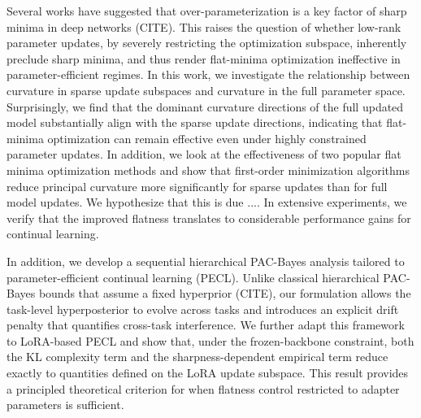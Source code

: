 \documentclass{article}
\theoremstyle{plain}
\theoremstyle{definition}
\theoremstyle{remark}
\newcommand{\JW}[1]{{\color{magenta}{\bf JW:} #1}}
\begin{document}
Several works have suggested that over-parameterization is a key factor of sharp minima in deep networks (CITE). This raises the question of whether low-rank parameter updates, by severely restricting the optimization subspace, inherently preclude sharp minima, and thus render flat-minima optimization ineffective in parameter-efficient regimes. In this work, we investigate the relationship between curvature in sparse update subspaces and curvature in the full parameter space. \JW{Surprisingly, we find that the dominant curvature directions of the full updated model substantially align with the sparse update directions, indicating that flat-minima optimization can remain effective even under highly constrained parameter updates. In addition, we look at the effectiveness of two popular flat minima optimization methods and show that first-order minimization algorithms reduce principal curvature more significantly for sparse updates than for full model updates. We hypothesize that this is due ....  In extensive experiments, we verify that the improved flatness translates to considerable performance gains for continual learning.  }


In addition, we develop a sequential hierarchical PAC-Bayes analysis tailored to parameter-efficient continual learning (PECL). Unlike classical hierarchical PAC-Bayes bounds that assume a fixed hyperprior (CITE), our formulation allows the task-level hyperposterior to evolve across tasks and introduces an explicit drift penalty that quantifies cross-task interference. We further adapt this framework to LoRA-based PECL and show that, under the frozen-backbone constraint, both the KL complexity term and the sharpness-dependent empirical term reduce exactly to quantities defined on the LoRA update subspace. This result provides a principled theoretical criterion for when flatness control restricted to adapter parameters is sufficient.
\end{document}
